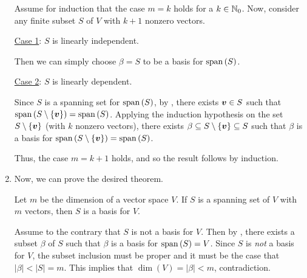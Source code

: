\begin{enumerate}
\begin{pf}
Assume for induction that the case \(m=k\) holds for a \(k\in\mathbb{N}_0\). Now,
consider any finite subset \(S\) of \(V\) with \(k+1\) nonzero vectors.

\underline{Case 1}: \(S\) is linearly independent.

Then we can simply choose \(\beta=S\) to be a basis for \(\operatorname{span}\qty(S)\).

\underline{Case 2}: \(S\) is linearly dependent.

Since \(S\) is a spanning set for \(\operatorname{span}\qty(S)\), by
, there exists \(\vb*{v}\in S\) such that
\(\operatorname{span}\qty(S\setminus \{\vb*{v}\})=\operatorname{span}\qty(S)\). Applying the induction hypothesis on
the set \(S\setminus \{\vb*{v}\}\) (with \(k\) nonzero vectors), there exists
\(\beta\subseteq S\setminus \{\vb*{v}\}\subseteq S\) such that \(\beta\) is a
basis for \(\operatorname{span}\qty(S\setminus \{\vb*{v}\})=\operatorname{span}\qty(S)\).

Thus, the case \(m=k+1\) holds, and so the result follows by induction.
\end{pf}

\item Now, we can prove the desired theorem.
\begin{theorem}
\label{thm:card-dim-spn-basis}
Let \(m\) be the dimension of a vector space \(V\). If \(S\) is a spanning set
of \(V\) with \(m\) vectors, then \(S\) is a basis for \(V\).
\end{theorem}
\begin{pf}
Assume to the contrary that \(S\) is not a basis for \(V\). Then by
, there exists a subset \(\beta\) of \(S\) such that
\(\beta\) is a basis for \(\operatorname{span}\qty(S)=V\). Since \(S\) is \emph{not} a basis for
\(V\), the subset inclusion must be proper and it must be the case that
\(|\beta|< |S|=m\). This implies that \(\dim(V)=|\beta|<m\), contradiction.
\end{pf}
\end{enumerate}
